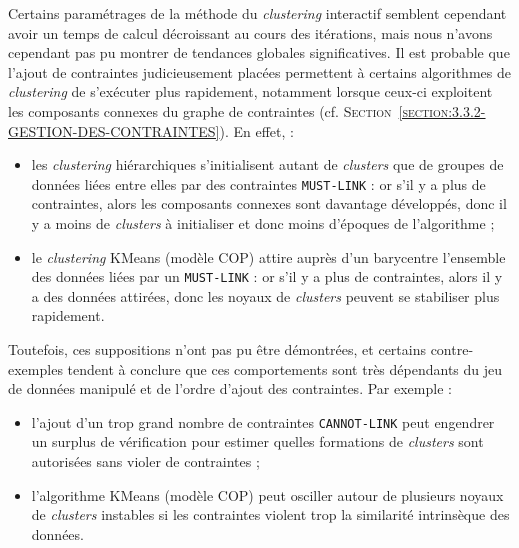 			\begin{leftBarAuthorOpinion}
				Certains paramétrages de la méthode du \textit{clustering} interactif semblent cependant avoir un temps de calcul décroissant au cours des itérations, mais nous n'avons cependant pas pu montrer de tendances globales significatives.
				Il est probable que l'ajout de contraintes judicieusement placées permettent à certains algorithmes de \textit{clustering} de s'exécuter plus rapidement, notamment lorsque ceux-ci exploitent les composants connexes du graphe de contraintes (cf. \textsc{Section~\ref{section:3.3.2-GESTION-DES-CONTRAINTES}}). En effet, :
				\begin{itemize}
					\item les \textit{clustering} hiérarchiques s'initialisent autant de \textit{clusters} que de groupes de données liées entre elles par des contraintes \texttt{MUST-LINK} : or s'il y a plus de contraintes, alors les composants connexes sont davantage développés, donc il y a moins de \textit{clusters} à initialiser et donc moins d'époques de l'algorithme ;
					\item le \textit{clustering} KMeans (modèle COP) attire auprès d'un barycentre l'ensemble des données liées par un \texttt{MUST-LINK} : or s'il y a plus de contraintes, alors il y a des données attirées, donc les noyaux de \textit{clusters} peuvent se stabiliser plus rapidement.  
				\end{itemize}
				Toutefois, ces suppositions n'ont pas pu être démontrées, et certains contre-exemples tendent à conclure que ces comportements sont très dépendants du jeu de données manipulé et de l'ordre d'ajout des contraintes. Par exemple :
				\begin{itemize}
					\item l'ajout d'un trop grand nombre de contraintes \texttt{CANNOT-LINK} peut engendrer un surplus de vérification pour estimer quelles formations de \textit{clusters} sont autorisées sans violer de contraintes ;
					\item l'algorithme KMeans (modèle COP) peut osciller autour de plusieurs noyaux de \textit{clusters} instables si les contraintes violent trop la similarité intrinsèque des données.
				\end{itemize}
			\end{leftBarAuthorOpinion}
			
